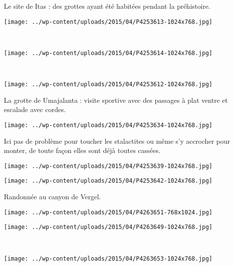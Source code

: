 \pagebreak
 Le site de Itas : des grottes ayant été habitées pendant la préhistoire. 
\begin{center} \texttt{[image: ../wp-content/uploads/2015/04/P4253613-1024x768.jpg]} \end{center}
~\\
\begin{center} \texttt{[image: ../wp-content/uploads/2015/04/P4253614-1024x768.jpg]} \end{center}
\vspace{-\topsep}

\pagebreak
~
\begin{center} \texttt{[image: ../wp-content/uploads/2015/04/P4253612-1024x768.jpg]} \end{center}

 La grotte de Umajalanta : visite sportive avec des passages à plat ventre et escalade avec cordes. 
\begin{center} \texttt{[image: ../wp-content/uploads/2015/04/P4253634-1024x768.jpg]} \end{center}
\vspace{-\topsep}

\pagebreak
 Ici pas de problème pour toucher les stalactites ou même s'y accrocher pour monter, de toute façon elles sont déjà toutes cassées. 
\begin{center} \texttt{[image: ../wp-content/uploads/2015/04/P4253639-1024x768.jpg]} \end{center}
\begin{center} \texttt{[image: ../wp-content/uploads/2015/04/P4253642-1024x768.jpg]} \end{center}
\vspace{-\topsep}
\vspace{-2.75mm}

\pagebreak
Randonnée au canyon de Vergel. 
\begin{center} \texttt{[image: ../wp-content/uploads/2015/04/P4263651-768x1024.jpg]} \end{center}
\begin{center} \texttt{[image: ../wp-content/uploads/2015/04/P4263649-1024x768.jpg]} \end{center}
\vspace{-\topsep}
\vspace{-0.75mm}

\pagebreak
~
\begin{center} \texttt{[image: ../wp-content/uploads/2015/04/P4263653-1024x768.jpg]} \end{center}

